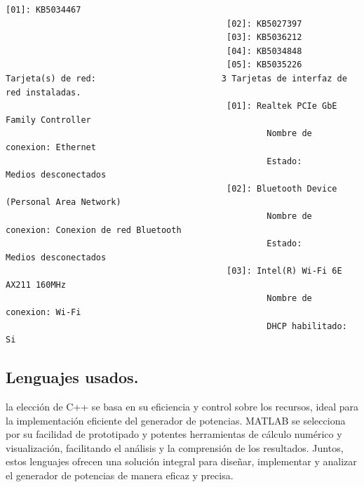 \documentclass{article}
\begin{document}
\begin{lstlisting}[language={},basicstyle=\ttfamily\footnotesize]
                                            [01]: KB5034467
                                            [02]: KB5027397
                                            [03]: KB5036212
                                            [04]: KB5034848
                                            [05]: KB5035226
Tarjeta(s) de red:                         3 Tarjetas de interfaz de red instaladas.
                                            [01]: Realtek PCIe GbE Family Controller
                                                    Nombre de conexion: Ethernet
                                                    Estado:             Medios desconectados
                                            [02]: Bluetooth Device (Personal Area Network)
                                                    Nombre de conexion: Conexion de red Bluetooth
                                                    Estado:             Medios desconectados
                                            [03]: Intel(R) Wi-Fi 6E AX211 160MHz
                                                    Nombre de conexion: Wi-Fi
                                                    DHCP habilitado:    Si

            \end{lstlisting}
    \subsection[Lenguajes]{Lenguajes usados.}
    la elección de C++ se basa en su eficiencia y control sobre los recursos, ideal para la implementación eficiente del generador de
    potencias. MATLAB se selecciona por su facilidad de prototipado y potentes herramientas de cálculo numérico y visualización,
    facilitando el análisis y la comprensión de los resultados. Juntos, estos lenguajes ofrecen una solución integral para diseñar,
    implementar y analizar el generador de potencias de manera eficaz y precisa.
\end{document}
